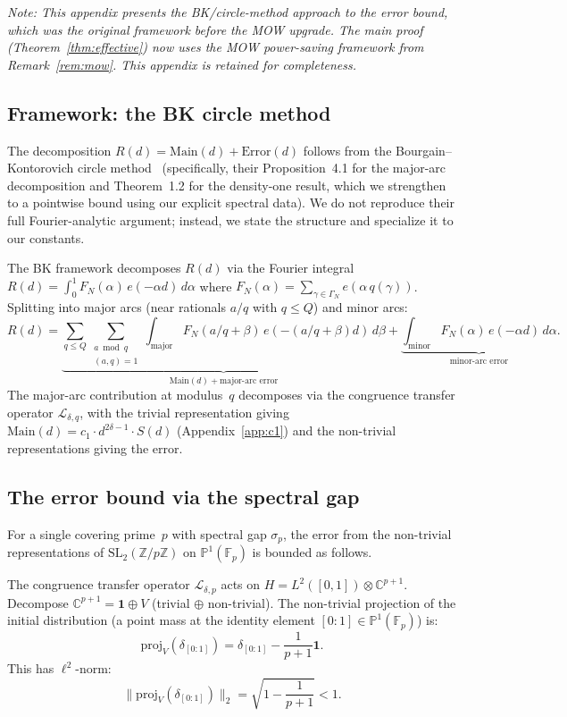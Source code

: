 \documentclass[11pt,a4paper]{amsart}
\theoremstyle{definition}
\begin{document}
\emph{Note: This appendix presents the BK/circle-method approach to the error bound, which was the original framework before the MOW upgrade. The main proof (Theorem~\ref{thm:effective}) now uses the MOW power-saving framework from Remark~\ref{rem:mow}. This appendix is retained for completeness.}

\subsection{Framework: the BK circle method}

The decomposition $R(d) = \text{Main}(d) + \text{Error}(d)$ follows from the Bourgain--Kontorovich circle method~\cite{BK2014} (specifically, their Proposition~4.1 for the major-arc decomposition and Theorem~1.2 for the density-one result, which we strengthen to a pointwise bound using our explicit spectral data). We do not reproduce their full Fourier-analytic argument; instead, we state the structure and specialize it to our constants.

The BK framework decomposes $R(d)$ via the Fourier integral $R(d) = \int_0^1 F_N(\alpha)\, e(-\alpha d)\, d\alpha$ where $F_N(\alpha) = \sum_{\gamma \in \Gamma_N} e(\alpha\, q(\gamma))$. Splitting into major arcs (near rationals $a/q$ with $q \leq Q$) and minor arcs:
\[
R(d) = \underbrace{\sum_{q \leq Q} \sum_{\substack{a \bmod q \\ (a,q)=1}} \int_{\text{major}} F_N(a/q + \beta)\, e(-(a/q+\beta)d)\, d\beta}_{\text{Main}(d) + \text{major-arc error}} + \underbrace{\int_{\text{minor}} F_N(\alpha)\, e(-\alpha d)\, d\alpha}_{\text{minor-arc error}}.
\]
The major-arc contribution at modulus~$q$ decomposes via the congruence transfer operator $\mathcal{L}_{\delta,q}$, with the trivial representation giving $\text{Main}(d) = c_1 \cdot d^{2\delta-1} \cdot S(d)$ (Appendix~\ref{app:c1}) and the non-trivial representations giving the error.

\subsection{The error bound via the spectral gap}

For a single covering prime~$p$ with spectral gap $\sigma_p$, the error from the non-trivial representations of $\text{SL}_2(\mathbb{Z}/p\mathbb{Z})$ on $\mathbb{P}^1(\mathbb{F}_p)$ is bounded as follows.

The congruence transfer operator $\mathcal{L}_{\delta,p}$ acts on $H = L^2([0,1]) \otimes \mathbb{C}^{p+1}$. Decompose $\mathbb{C}^{p+1} = \mathbf{1} \oplus V$ (trivial $\oplus$ non-trivial). The non-trivial projection of the initial distribution (a point mass at the identity element $[0:1] \in \mathbb{P}^1(\mathbb{F}_p)$) is:
\[
\text{proj}_V(\delta_{[0:1]}) = \delta_{[0:1]} - \frac{1}{p+1}\mathbf{1}.
\]
This has $\ell^2$-norm:
\[
\|\text{proj}_V(\delta_{[0:1]})\|_2 = \sqrt{1 - \frac{1}{p+1}} < 1.
\]
\end{document}
